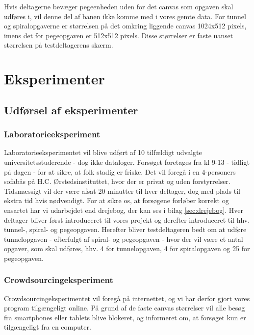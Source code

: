 Hvis deltagerne bevæger pegeenheden uden for det canvas som opgaven skal udføres i, vil denne del af banen ikke komme med i vores gemte data. For tunnel og spiralopgaverne er størrelsen på det omkring liggende canvas 1024x512 pixels, imens det for pegeopgaven er 512x512 pixels. Disse størrelser er faste uanset størrelsen på testdeltagerens skærm.

\chapter*{Eksperimenter}

\section*{Udførsel af eksperimenter}

\subsection*{Laboratorieeksperiment}
Laboratorieeksperimentet vil blive udført af 10 tilfældigt udvalgte universitetsstuderende - dog ikke dataloger.
Forsøget foretages fra kl 9-13 - tidligt på dagen - for at sikre, at folk stadig er friske. Det vil foregå i en 4-personers sofabås på H.C. Ørstedsinstituttet, hvor der er privat og uden forstyrrelser.
Tidsmæssigt vil der være afsat 20 minutter til hver deltager, dog med plads til ekstra tid hvis nødvendigt. For at sikre os, at forsøgene forløber korrekt og ensartet har vi udarbejdet end drejebog, der kan ses i bilag \ref{sec:drejebog}. Hver deltager bliver først introduceret til vores projekt og derefter introduceret til hhv. tunnel-, spiral- og pegeopgaven.
Herefter bliver testdeltageren bedt om at udføre tunnelopgaven - efterfulgt af spiral- og pegeopgaven - hvor der vil være et antal opgaver, som skal udføres, hhv. 4 for tunnelopgaven, 4 for spiralopgaven og 25 for pegeopgaven.

\subsection*{Crowdsourcingeksperiment}
Crowdsourcingeksperimentet vil foregå på internettet, og vi har derfor gjort vores program tilgængeligt online. På grund af de faste canvas størrelser vil alle besøg fra smartphones eller tablets blive blokeret, og informeret om, at forsøget kun er tilgængeligt fra en computer. 

